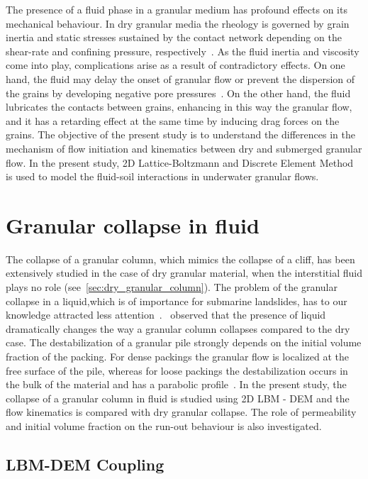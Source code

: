 The presence of a fluid phase in a granular medium has profound effects on its 
mechanical behaviour. In dry granular media the rheology is governed by grain 
inertia and static stresses sustained by the contact network depending on the 
shear-rate and confining pressure, respectively~\citep{Midi2004}. As the fluid 
inertia and viscosity come into play, complications arise as a result of 
contradictory effects. On one hand, the fluid may delay the onset of
granular flow or prevent the dispersion of the grains by
developing negative pore pressures~\citep{Pailha2008,Topin2011}. On the other
hand, the fluid lubricates the contacts between grains, enhancing in this way 
the granular flow, and it has a retarding effect at the same time by inducing 
drag forces on the grains. The objective of the present study is to understand 
the differences in the mechanism of flow initiation and kinematics between dry 
and submerged granular flow. In the present study, 2D Lattice-Boltzmann and 
Discrete Element Method is used to model the fluid-soil interactions in  
underwater granular flows.

\section{Granular collapse in fluid}

The collapse of a granular column, which mimics the
collapse of a cliff, has been extensively studied in the case of
dry granular material, when the interstitial fluid plays no
role (see~\cref{sec:dry_granular_column}). The problem of the granular collapse 
in a liquid,which is of importance for submarine landslides, has to our
knowledge attracted less attention~\citep{Rondon2011}.~\citet{THOMPSON2007} 
observed that the presence of liquid dramatically changes the way a granular 
column collapses compared to the dry case. The destabilization of a granular 
pile strongly depends on the initial volume fraction of the packing. For dense 
packings the granular flow is localized at the free surface of the pile, 
whereas for loose packings the destabilization occurs in the bulk of the
material and has a parabolic profile~\citep{Bonnet2010,Topin2011,Iverson2000}. 
In the present study, the collapse of a granular column in fluid is studied 
using 2D LBM - DEM and the flow kinematics is compared with dry granular 
collapse. The role of permeability and initial volume fraction on the run-out 
behaviour is also investigated.  

\subsection{LBM-DEM Coupling}

